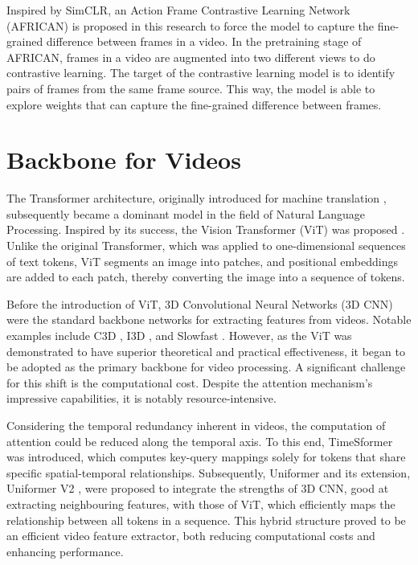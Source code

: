 Inspired by SimCLR, an Action Frame Contrastive Learning Network (AFRICAN) is proposed in this research to force the model to capture the fine-grained difference between frames in a video. In the pretraining stage of AFRICAN, frames in a video are augmented into two different views to do contrastive learning. The target of the contrastive learning model is to identify pairs of frames from the same frame source. This way, the model is able to explore weights that can capture the fine-grained difference between frames. 

\section{Backbone for Videos}
The Transformer architecture, originally introduced for machine translation \parencite{vaswani2017attention}, subsequently became a dominant model in the field of Natural Language Processing. Inspired by its success, the Vision Transformer (ViT) was proposed \parencite{dosovitskiy2020image}. Unlike the original Transformer, which was applied to one-dimensional sequences of text tokens, ViT segments an image into patches, and positional embeddings are added to each patch, thereby converting the image into a sequence of tokens.

Before the introduction of ViT, 3D Convolutional Neural Networks (3D CNN) were the standard backbone networks for extracting features from videos. Notable examples include C3D \parencite{tran2015learning}, I3D \parencite{carreira2017quo}, and Slowfast \parencite{feichtenhofer2019slowfast}. However, as the ViT was demonstrated to have superior theoretical and practical effectiveness, it began to be adopted as the primary backbone for video processing. A significant challenge for this shift is the computational cost. Despite the attention mechanism's impressive capabilities, it is notably resource-intensive.

Considering the temporal redundancy inherent in videos, the computation of attention could be reduced along the temporal axis. To this end, TimeSformer \parencite{bertasius2021space} was introduced, which computes key-query mappings solely for tokens that share specific spatial-temporal relationships. Subsequently, Uniformer \parencite{li2022uniformer} and its extension, Uniformer V2 \parencite{li2022uniformerv2}, were proposed to integrate the strengths of 3D CNN, good at extracting neighbouring features, with those of ViT, which efficiently maps the relationship between all tokens in a sequence. This hybrid structure proved to be an efficient video feature extractor, both reducing computational costs and enhancing performance. 

